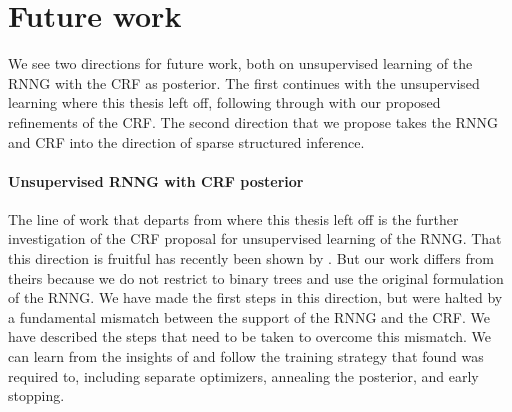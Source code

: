 
\section{Future work}
  We see two directions for future work, both on unsupervised learning of the RNNG with the CRF as posterior. The first continues with the unsupervised learning where this thesis left off, following through with our proposed refinements of the CRF. The second direction that we propose takes the RNNG and CRF into the direction of sparse structured inference.

  \paragraph{Unsupervised RNNG with CRF posterior}
    The line of work that departs from where this thesis left off is the further investigation of the CRF proposal for unsupervised learning of the RNNG. That this direction is fruitful has recently been shown by \citet{kim2019unsupervised}. But our work differs from theirs because we do not restrict to binary trees and use the original formulation of the RNNG. We have made the first steps in this direction, but were halted by a fundamental mismatch between the support of the RNNG and the CRF. We have described the steps that need to be taken to overcome this mismatch. We can learn from the insights of \cite{kim2019unsupervised} and follow the training strategy that found was required to, including separate optimizers, annealing the posterior, and early stopping.

